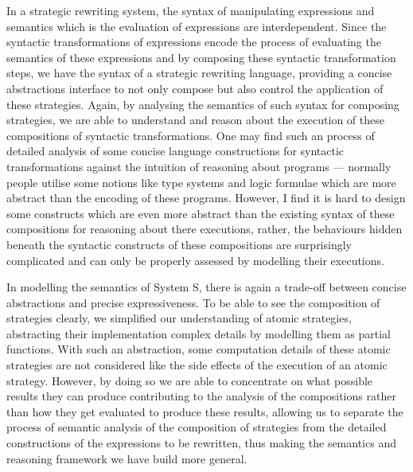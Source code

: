 In a strategic rewriting system, the syntax of manipulating expressions and semantics which is the evaluation of expressions are interdependent. Since the syntactic transformations of expressions encode the process of evaluating the semantics of these expressions and by composing these syntactic transformation steps, we have the syntax of a strategic rewriting language, providing a concise abstractions interface to not only compose but also control the application of these strategies. Again, by analysing the semantics of such syntax for composing strategies, we are able to understand and reason about the execution of these compositions of syntactic transformations. One may find such an process of detailed analysis of some concise language constructions for syntactic transformations against the intuition of reasoning about programs --- normally people utilise some notions like type systems and logic formulae which are more abstract than the encoding of these programs. However, I find it is hard to design some constructs which are even more abstract than the existing syntax of these compositions for reasoning about there executions, rather, the behaviours hidden beneath the syntactic constructs of these compositions are surprisingly complicated and can only be properly assessed by modelling their executions. 

In modelling the semantics of System S, there is again a trade-off between concise abstractions and precise expressiveness. To be able to see the composition of strategies clearly, we simplified our understanding of atomic strategies, abstracting their implementation complex details by modelling them as partial functions. With such an abstraction, some computation details of these atomic strategies are not considered like the side effects of the execution of an atomic strategy. However, by doing so we are able to concentrate on what possible results they can produce contributing to the analysis of the compositions rather than how they get evaluated to produce these results, allowing us to separate the process of semantic analysis of the composition of strategies from the detailed constructions of the expressions to be rewritten, thus making the semantics and reasoning framework we have build more general.



